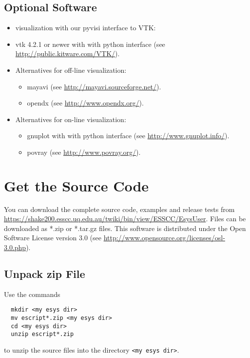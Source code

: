 \subsection{Optional Software}

\begin{itemize}
   \item visualization with our pyvisi interface to VTK:
      \item vtk  4.2.1 or newer with with python interface (see \url{http://public.kitware.com/VTK/}).
   \item Alternatives for off-line visualization:
      \begin{itemize}
      \item mayavi (see \url{http://mayavi.sourceforge.net/}).
      \item opendx (see \url{http://www.opendx.org/}).
      \end{itemize}
   \item Alternatives for on-line visualization:
\begin{itemize}
      \item gnuplot  with with python interface (see \url{http://www.gnuplot.info/}).
      \item  povray (see \url{http://www.povray.org/}).
\end{itemize}
\end{itemize}

\section{Get the Source Code}

You can download the complete source code, examples and release tests from \url{https://shake200.esscc.uq.edu.au/twiki/bin/view/ESSCC/EsysUser}.
Files can be downloaded as *.zip or *.tar.gz files. 
This software is distributed under the Open Software License version 3.0 (see \url{http://www.opensource.org/licenses/osl-3.0.php}).

\subsection{Unpack zip File}
Use the commands

\begin{verbatim}
  mkdir <my esys dir>
  mv escript*.zip <my esys dir>
  cd <my esys dir>
  unzip escript*.zip
\end{verbatim}

to unzip the source files into the directory  \verb|<my esys dir>|.

